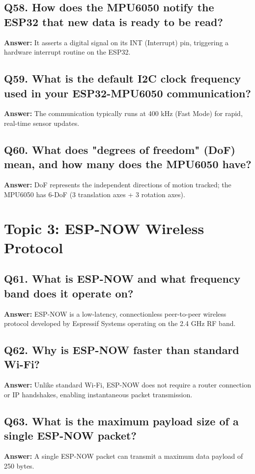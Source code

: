 \documentclass[12pt,a4paper,oneside]{report}
\begin{document}
\section{Q58. How does the MPU6050 notify the ESP32 that new data is ready to be read?}
\textbf{Answer:} It asserts a digital signal on its INT (Interrupt) pin, triggering a hardware interrupt routine on the ESP32.

\section{Q59. What is the default I2C clock frequency used in your ESP32-MPU6050 communication?}
\textbf{Answer:} The communication typically runs at 400 kHz (Fast Mode) for rapid, real-time sensor updates.

\section{Q60. What does "degrees of freedom" (DoF) mean, and how many does the MPU6050 have?}
\textbf{Answer:} DoF represents the independent directions of motion tracked; the MPU6050 has 6-DoF (3 translation axes + 3 rotation axes).

\chapter{Topic 3: ESP-NOW Wireless Protocol}

\section{Q61. What is ESP-NOW and what frequency band does it operate on?}
\textbf{Answer:} ESP-NOW is a low-latency, connectionless peer-to-peer wireless protocol developed by Espressif Systems operating on the 2.4 GHz RF band.

\section{Q62. Why is ESP-NOW faster than standard Wi-Fi?}
\textbf{Answer:} Unlike standard Wi-Fi, ESP-NOW does not require a router connection or IP handshakes, enabling instantaneous packet transmission.

\section{Q63. What is the maximum payload size of a single ESP-NOW packet?}
\textbf{Answer:} A single ESP-NOW packet can transmit a maximum data payload of 250 bytes.
\end{document}

